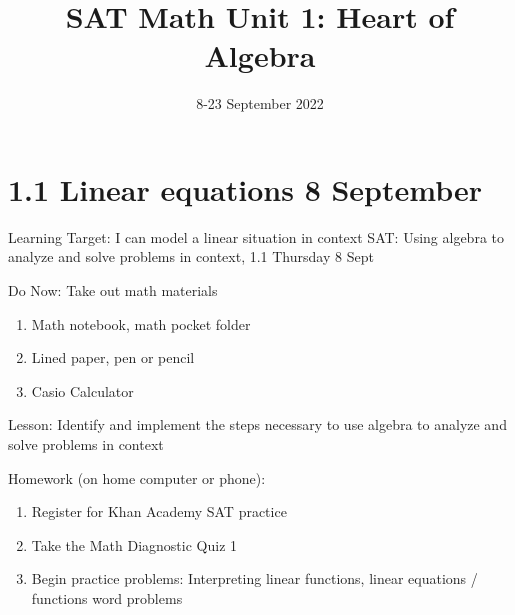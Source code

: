 

\title{SAT Math Unit 1: Heart of Algebra}
\date{8-23 September 2022}


\frame{\titlepage}

\section[Outline]{}
\frame{\tableofcontents}

\section{1.1 Linear equations \hfill 8 September}
\begin{frame}{Learning Target: I can model a linear situation in context}
  {SAT: Using algebra to analyze and solve problems in
  context, \hfill \alert{1.1 Thursday 8 Sept}}
  \begin{block}{Do Now: Take out math materials}
    \begin{enumerate}
        \item Math notebook, math pocket folder
        \item Lined paper, pen or pencil
        \item Casio Calculator
    \end{enumerate}
    \end{block}
    Lesson: Identify and implement the steps necessary to use algebra to analyze and
    solve problems in context \par \medskip
    Homework (on home computer or phone): 
    \begin{enumerate}
      \item Register for Khan Academy SAT practice
      \item Take the Math Diagnostic Quiz 1
      \item Begin practice problems: Interpreting linear functions, linear equations / functions word problems
    \end{enumerate}
  \end{frame}

